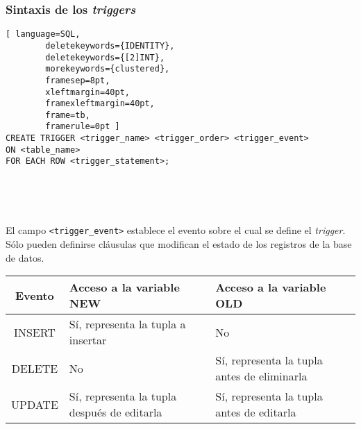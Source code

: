 \begin{frame}[fragile]
	
	\frametitle{Sintaxis de los \emph{triggers}}
	
	\begin{lstlisting}[ language=SQL,
		deletekeywords={IDENTITY},
		deletekeywords={[2]INT},
		morekeywords={clustered},
		framesep=8pt,
		xleftmargin=40pt,
		framexleftmargin=40pt,
		frame=tb,
		framerule=0pt ]
CREATE TRIGGER <trigger_name> <trigger_order> <trigger_event> 
ON <table_name> 
FOR EACH ROW <trigger_statement>;
\end{lstlisting}
	
	\ 
	
	\ 
	
	\pause
	
	El campo \texttt{<trigger\_event>} establece el evento sobre el cual se define el \emph{trigger}. S\'olo pueden definirse cláusulas que modifican el estado de los registros de la base de datos. 
	
	\pause
	
	\begin{table}
		\begin{tabular}{| c | C{5cm} | C{5cm} |}
			\hline
			Evento & Acceso a la variable \textcolor{codepurple}{NEW} & Acceso a la variable \textcolor{codepurple}{OLD} \\ \hline \hline
			\textcolor{codepurple}{INSERT} & Sí, representa la tupla a insertar & No \\ \hline
			\textcolor{codepurple}{DELETE} & No & Sí, representa la tupla antes de eliminarla \\ \hline
			\textcolor{codepurple}{UPDATE} & Sí, representa la tupla después de editarla & Sí, representa la tupla antes de editarla \\ \hline
		\end{tabular}
	\end{table}
	
\end{frame}


